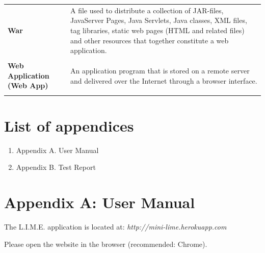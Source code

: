 \documentclass[a4paper,11pt,twoside]{report}
\theoremstyle{definition}
\begin{document}
\begin{longtable}{p{4cm} p{11cm}}
\textbf{War } & A file used to distribute a collection of JAR-files, JavaServer Pages, Java Servlets, Java classes, XML files, tag libraries, static web pages (HTML and related files) and other resources that together constitute a web application. \\ \\
\textbf{Web Application (Web App)} & An application program that is stored on a remote server and delivered over the Internet through a browser interface.\\ \\



\end{longtable}

\thispagestyle{empty}


\listoffigures
\thispagestyle{empty}



\renewcommand{\listtablename}{List of tables}
\listoftables
\thispagestyle{empty}


\chapter*{List of appendices}
\begin{enumerate}
\item Appendix A. User Manual
\item Appendix B. Test Report
\end{enumerate}
\thispagestyle{empty}


\chapter{Appendix A: User Manual}


The L.I.M.E. application is located at: \textit{http://mini-lime.herokuapp.com}

Please open the website in the browser (recommended: Chrome).
\end{document}
